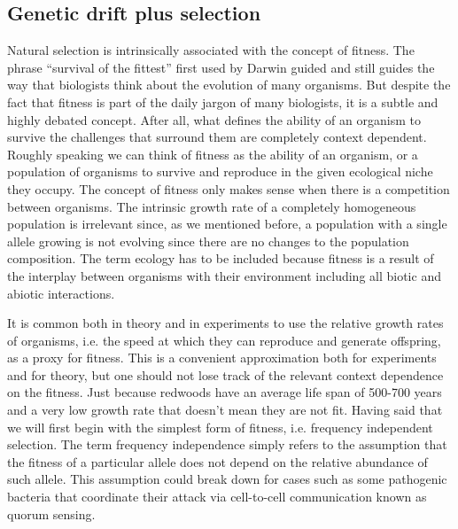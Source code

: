 \subsection{Genetic drift plus selection}

Natural selection is intrinsically associated with the concept of fitness. The
phrase ``survival of the fittest'' first used by Darwin guided and still guides
the way that biologists think about the evolution of many organisms. But despite
the fact that fitness is part of the daily jargon of many biologists, it is a
subtle and highly debated concept. After all, what defines the ability of an
organism to survive the challenges that surround them are completely context
dependent. Roughly speaking we can think of fitness as the ability of an
organism, or a population of organisms to survive and reproduce in the given
ecological niche they occupy. The concept of fitness only makes sense when there
is a competition between organisms. The intrinsic growth rate of a completely
homogeneous population is irrelevant since, as we mentioned before, a population
with a single allele growing is not evolving since there are no changes to the
population composition. The term ecology has to be included because fitness is a
result of the interplay between organisms with their environment including all
biotic and abiotic interactions. 

It is common both in theory and in experiments to use the relative growth rates
of organisms, i.e. the speed at which they can reproduce and generate
offspring, as a proxy for fitness. This is a convenient approximation both
for experiments and for theory, but one should not lose track of the relevant
context dependence on the fitness. Just because redwoods have an average life
span of 500-700 years and a very low growth rate that doesn't mean they are not
fit. Having said that we will first begin with the simplest form of fitness,
i.e. frequency independent selection. The term frequency independence simply
refers to the assumption that the fitness of a particular allele does not
depend on the relative abundance of such allele. This assumption could break
down for cases such as some pathogenic bacteria that coordinate their attack
via cell-to-cell communication known as quorum sensing. 

